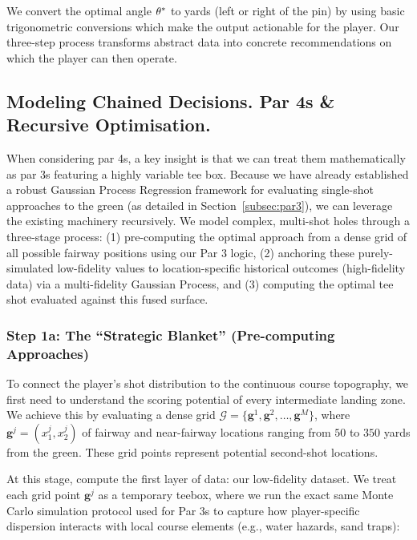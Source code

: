 \documentclass[11pt, letterpaper]{article}
\begin{document}
We convert the optimal angle $\theta^*$ to yards (left or right of the pin) by using basic trigonometric conversions which make the output actionable for the player. Our three-step process transforms abstract data into concrete recommendations on which the player can then operate.

\subsection{Modeling Chained Decisions. Par 4s \& Recursive Optimisation.} 
\label{subsec: par4}

When considering par 4s, a key insight is that we can treat them mathematically as par 3s featuring a highly variable tee box. Because we have already established a robust Gaussian Process Regression framework for evaluating single-shot approaches to the green (as detailed in Section~\ref{subsec:par3}), we can leverage the existing machinery recursively. We model complex, multi-shot holes through a three-stage process:
(1) pre-computing the optimal approach from a dense grid of all possible fairway positions using our Par 3 logic, (2) anchoring these purely-simulated low-fidelity values to location-specific historical outcomes (high-fidelity data) via a multi-fidelity Gaussian Process, and (3) computing the optimal tee shot evaluated against this fused surface.

\subsubsection{Step 1a: The ``Strategic Blanket'' (Pre-computing Approaches)}
\label{subsec: strategicBlanket}

To connect the player's shot distribution to the continuous course topography, we first need to understand the scoring potential of every intermediate landing zone. We achieve this by evaluating a dense grid $\mathcal{G} = \{\mathbf{g}^1, \mathbf{g}^2, \ldots, \mathbf{g}^M\}$, where $\mathbf{g}^j = (x_1^j, x_2^j)$ of fairway and near-fairway locations ranging from $50$ to $350$ yards from the green. These grid points represent potential second-shot locations.

At this stage, compute the first layer of data: our low-fidelity dataset. We treat each grid point $\mathbf{g}^j$ as a temporary teebox, where we run the exact same Monte Carlo simulation protocol used for Par 3s to capture how player-specific dispersion interacts with local course elements (e.g., water hazards, sand traps):
\end{document}
